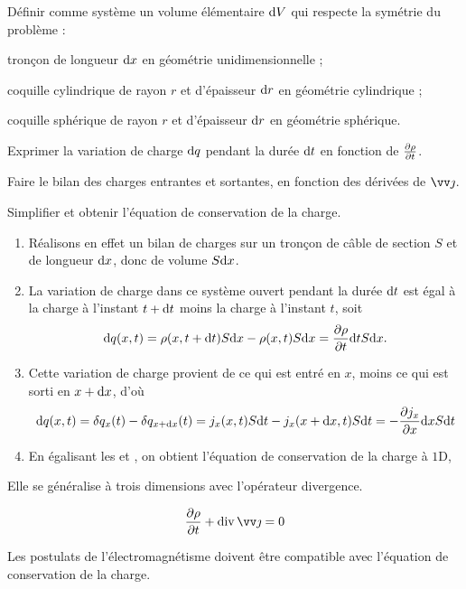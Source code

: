 \documentclass[12pt,fancy]{cours}
\begin{document}
\begin{methode}
  \item	Définir comme système un volume élémentaire $\mathrm{d} V$ qui respecte la symétrie du problème :
  \begin{liste}
    \item tronçon de longueur $\mathrm{d} x$ en géométrie unidimensionnelle ; 
    \item coquille cylindrique de rayon $r$ et d’épaisseur $\mathrm{d} r$ en géométrie cylindrique ;
    \item coquille sphérique de rayon $r$ et d’épaisseur $\mathrm{d} r$ en géométrie sphérique. 
  \end{liste}
  \item Exprimer la variation de charge $\mathrm{d} q$ pendant la durée $\mathrm{d} t$ en fonction de $\frac{\partial{\rho}}{\partial{t}}$.
  \item Faire le bilan des charges entrantes et sortantes, en fonction des dérivées de $\j$.
  \item Simplifier et obtenir l’équation de conservation de la charge.
\end{methode}

\begin{enumerate}
  \item 
  Réalisons en effet un bilan de charges sur un tronçon de câble de section $S$ et de longueur $\mathrm{d} x$, donc de volume $S\mathrm{d} x$.
  
\item La variation de charge dans ce système ouvert pendant la durée $\mathrm{d} t$ est égal à la charge à l'instant $t+\mathrm{d} t$ moins la charge à l'instant $t$, soit
\begin{equation}\label{eq:1}
\mathrm{d} q(x,t) =\rho(x,t+\mathrm{d} t)S\mathrm{d} x-\rho(x,t)S\mathrm{d} x=\frac{\partial \rho}{\partial t}\mathrm{d} t S \mathrm{d} x.
\end{equation}
\item 
Cette variation de charge provient de ce qui est entré en $x$, moins ce qui est sorti en $x+\mathrm{d} x$, d'où
\begin{equation}\label{eq:2}
\mathrm{d} q(x,t)=\delta q_x(t)-\delta q_{x+\mathrm{d} x}(t)=j_x(x,t)S\mathrm{d} t-j_{x}(x+\mathrm{d} x,t)S\mathrm{d} t=-\frac{\partial j_x}{\partial x}\mathrm{d} x S \mathrm{d} t
\end{equation}
\item 
En égalisant les  et , on obtient l'équation de conservation de la charge à $1$D,
\end{enumerate}
Elle se généralise à trois dimensions avec l’opérateur divergence.
\begin{theorem}\label{form:q_cons}
\begin{equation*}
\frac{\partial \rho}{\partial t}+\dive{\j}=0
\end{equation*}
\end{theorem}
\noindent
Les postulats de l’électromagnétisme doivent être compatible avec l’équation de conservation de la charge.
\end{document}
